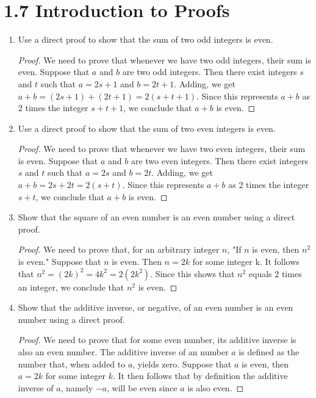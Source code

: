 \documentclass[11pt]{article}
\begin{document}
\section*{\textbf{1.7 Introduction to Proofs}}
\begin{enumerate}[label=\textbf{\arabic*.}]
	\item Use a direct proof to show that the sum of two odd integers is even.
	
	\begin{proof}
		We need to prove that whenever we have two odd integers, their sum is even. Suppose that $a$ and $b$ are two odd integers. Then there exist integers $s$ and $t$ such that $a = 2s + 1$ and $b = 2t + 1$.  Adding, we get $a + b = (2s + 1) + (2t + 1) = 2(s + t + 1)$. Since this represents $a + b$ as 2 times the integer $s + t + 1$, we conclude that $a + b$ is even.
	\end{proof}

	\pagebreak
	\item Use a direct proof to show that the sum of two even integers is even.
	
	\begin{proof}
		We need to prove that whenever we have two even integers, their sum is even. Suppose that $a$ and $b$ are two even integers. Then there exist integers $s$ and $t$ such that $a = 2s$ and $b = 2t$. Adding, we get $a + b = 2s + 2t = 2(s + t)$. Since this represents $a + b$ as 2 times the integer $s + t$, we conclude that $a + b$ is even.
	\end{proof}

	\item Show that the square of an even number is an even number using a direct proof.
	
	\begin{proof}
		We need to prove that, for an arbitrary integer $n$, "If $n$ is even, then $n^2$ is even." Suppose that $n$ is even. Then $n = 2k$ for some integer k. It follows that $n^2 = (2k)^2 = 4k^2 = 2(2k^2)$. Since this shows that $n^2$ equals 2 times an integer, we conclude that $n^2$ is even.
	\end{proof}

	\item Show that the additive inverse, or negative, of an even number is an even number using a direct proof.
	
	\begin{proof}
		We need to prove that for some even number, its additive inverse is also an even number. The additive inverse of an number $a$ is defined as the number that, when added to $a$, yields zero. Suppose that $a$ is even, then $a = 2k$ for some integer $k$. It then follows that by definition the additive inverse of $a$, namely $-a$, will be even since $a$ is also even.
	\end{proof}


\end{enumerate}
\end{document}
